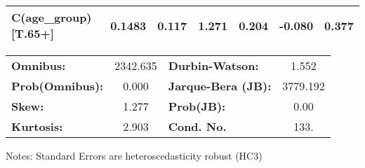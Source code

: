 \begin{center}
\begin{tabular}{lcccccc}
\textbf{C(age\_group)[T.65+]}                                                     &       0.1483  &        0.117     &     1.271  &         0.204        &       -0.080    &        0.377     \\
\bottomrule
\end{tabular}
\begin{tabular}{lclc}
\textbf{Omnibus:}       & 2342.635 & \textbf{  Durbin-Watson:     } &    1.552  \\
\textbf{Prob(Omnibus):} &   0.000  & \textbf{  Jarque-Bera (JB):  } & 3779.192  \\
\textbf{Skew:}          &   1.277  & \textbf{  Prob(JB):          } &     0.00  \\
\textbf{Kurtosis:}      &   2.903  & \textbf{  Cond. No.          } &     133.  \\
\bottomrule
\end{tabular}
\end{center}

Notes: \newline
 [1] Standard Errors are heteroscedasticity robust (HC3)